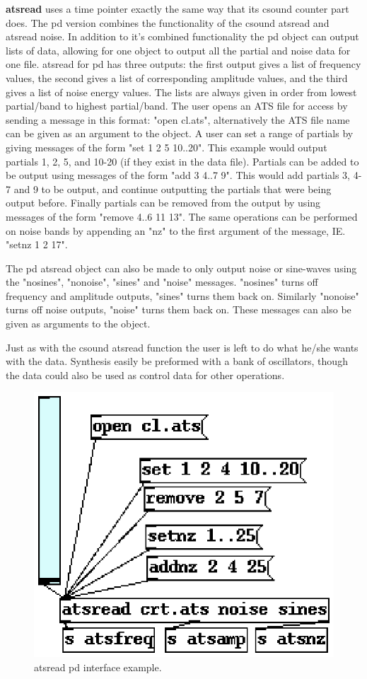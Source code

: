 \documentclass[10pt,letterpaper]{article}
\begin{document}
\textbf{atsread} uses a time pointer exactly the same way that its csound counter part does.  The pd version combines the functionality of the csound atsread and atsread noise.  In addition to it's combined functionality the pd object can output lists of data, allowing for one object to output all the partial and noise data for one file.  atsread for pd has three outputs: the first output gives a list of frequency values, the second gives a list of corresponding amplitude values, and the third gives a list of noise energy values.  The lists are always given in order from lowest partial/band to highest partial/band.  The user opens an ATS file for access by sending a message in this format: "open cl.ats", alternatively the ATS file name can be given as an argument to the object.  A user can set a range of partials by giving messages of the form "set 1 2 5 10..20".  This example would output partials 1, 2, 5, and 10-20 (if they exist in the data file).  Partials can be added to be output using messages of the form "add 3 4..7 9".  This would add partials 3, 4-7 and 9 to be output, and continue outputting the partials that were being output before.  Finally partials can be removed from the output by using messages of the form "remove 4..6 11 13".  The same operations can be performed on noise bands by appending an "nz" to the first argument of the message, IE. "setnz 1 2 17".

The pd atsread object can also be made to only output noise or sine-waves using the "nosines", "nonoise", "sines" and "noise" messages.  "nosines" turns off frequency and amplitude outputs, "sines" turns them back on.  Similarly "nonoise" turns off noise outputs, "noise" turns them back on.  These messages can also be given as arguments to the object.

Just as with the csound atsread function the user is left to do what he/she wants with the data.  Synthesis easily be preformed with a bank of oscillators, though the data could also be used as control data for other operations.


\begin{figure}[htb]
	\begin{center}
	\includegraphics{ats-pd-example.eps}
	\caption{atsread pd interface example.}
	\label{fig:emptybox}
	\end{center}
\end{figure}
\end{document}
